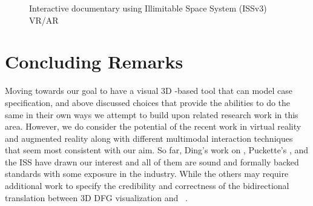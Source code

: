 \begin{figure*}[htpb]
\begin{center}
\caption{Interactive documentary using Illimitable Space System (ISSv3) VR/AR \cite{iss-v3-ar-vr-sa2016}}
\label{fig:iss-v3-ar-vr-some-more}
\end{center}
\end{figure*}

\section{Concluding Remarks}

Moving towards our goal to have a visual 3D {\dfg}-based tool that can model 
{\flucid} case specification, and above discussed choices that provide 
the abilities to do the same in their own ways we attempt to build upon 
related research work in this area. However, we do consider the potential of 
the recent work in virtual reality and augmented reality along with 
different multimodal interaction techniques that seem most consistent with 
our aim. So far, Ding's work on {\graphviz}, Puckette's {\puredata}, {\bpel} and the 
ISS have drawn our interest and all of them are sound and formally backed 
standards with some exposure in the industry. While the others may require 
additional work to specify the credibility and correctness of the 
bidirectional translation between 3D DFG visualization and {\flucid}~\cite{flucid-dfg-viz-pst2011}.

